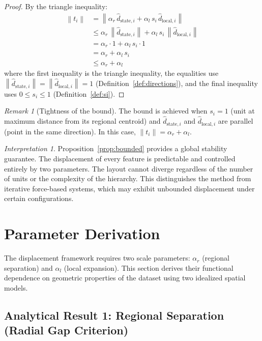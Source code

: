 \documentclass[12pt, a4paper]{article}
\numberwithin{equation}{section}
\theoremstyle{definition}
\theoremstyle{plain}
\theoremstyle{remark}
\newtheorem*{remark}{Remark}
\newtheorem*{interpretation}{Interpretation}
\newcommand{\norm}[1]{\left\|#1\right\|}
\newcommand{\dhati}[1]{\hat{d}_{\text{#1},i}}
\begin{document}
\begin{proof}
By the triangle inequality:
\begin{align}
  \norm{t_i} &= \norm{\alpha_r\,\dhati{state} + \alpha_l\,s_i\,\dhati{local}} \nonumber \\
  &\leq \alpha_r\,\norm{\dhati{state}} + \alpha_l\,s_i\,\norm{\dhati{local}} \label{eq:triangle} \\
  &= \alpha_r \cdot 1 + \alpha_l\,s_i \cdot 1 \nonumber \\
  &= \alpha_r + \alpha_l\,s_i \nonumber \\
  &\leq \alpha_r + \alpha_l \nonumber
\end{align}
where the first inequality is the triangle inequality, the equalities use $\norm{\dhati{state}} = \norm{\dhati{local}} = 1$ (Definition~\ref{def:directions}), and the final inequality uses $0 \leq s_i \leq 1$ (Definition~\ref{def:si}).
\end{proof}

\begin{remark}[Tightness of the bound]
The bound is achieved when $s_i = 1$ (unit at maximum distance from its regional centroid) and $\dhati{state}$ and $\dhati{local}$ are parallel (point in the same direction). In this case, $\norm{t_i} = \alpha_r + \alpha_l$.
\end{remark}

\begin{interpretation}
Proposition~\ref{prop:bounded} provides a global stability guarantee. The displacement of every feature is predictable and controlled entirely by two parameters. The layout cannot diverge regardless of the number of units or the complexity of the hierarchy. This distinguishes the method from iterative force-based systems, which may exhibit unbounded displacement under certain configurations.
\end{interpretation}


\section{Parameter Derivation}
\label{sec:params}

The displacement framework requires two scale parameters: $\alpha_r$ (regional separation) and $\alpha_l$ (local expansion). This section derives their functional dependence on geometric properties of the dataset using two idealized spatial models.

\subsection{Analytical Result 1: Regional Separation (Radial Gap Criterion)}
\end{document}
